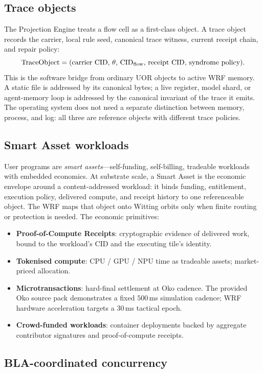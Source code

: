 \documentclass[11pt,letterpaper]{article}
\theoremstyle{remark}
\begin{document}
\subsection{Trace objects}

The Projection Engine treats a flow cell as a first-class object. A trace object records
the carrier, local rule seed, canonical trace witness, current receipt chain, and repair
policy:
\[
\text{TraceObject}
=
(\text{carrier CID},\,\theta,\,\mathrm{CID}_{\rm flow},\,\text{receipt CID},\,\text{syndrome policy}).
\]
This is the software bridge from ordinary UOR objects to active WRF memory. A static file
is addressed by its canonical bytes; a live register, model shard, or agent-memory loop is
addressed by the canonical invariant of the trace it emits. The operating system does
not need a separate distinction between memory, process, and log: all three are reference
objects with different trace policies.

\subsection{Smart Asset workloads}

User programs are \emph{smart assets}---self-funding, self-billing, tradeable workloads
with embedded economics. At substrate scale, a Smart Asset is the economic envelope around
a content-addressed workload: it binds funding, entitlement, execution policy, delivered
compute, and receipt history to one referenceable object. The WRF maps that object onto
Witting orbits only when finite routing or protection is needed. The economic primitives:
\begin{itemize}[leftmargin=2em,nosep]
\item \textbf{Proof-of-Compute Receipts}: cryptographic evidence of delivered work, bound
to the workload's CID and the executing tile's identity.
\item \textbf{Tokenised compute}: CPU / GPU / NPU time as tradeable assets;
market-priced allocation.
\item \textbf{Microtransactions}: hard-final settlement at Oko cadence. The provided Oko
source pack demonstrates a fixed $500$\,ms simulation cadence; WRF hardware acceleration
targets a $30$\,ms tactical epoch.
\item \textbf{Crowd-funded workloads}: container deployments backed by aggregate
contributor signatures and proof-of-compute receipts.
\end{itemize}

\subsection{BLA-coordinated concurrency}
\end{document}

